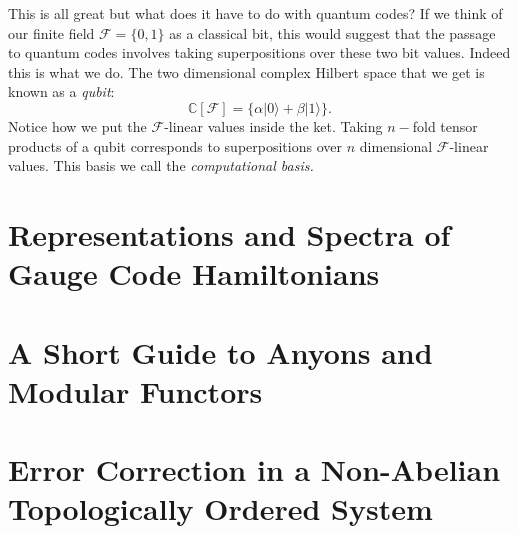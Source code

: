 \documentclass[11pt,twoside,openright]{report}
\newcommand{\todo}[1]{\textcolor{red}{#1}}
\def\Complex{\mathbb{C}}
\newcommand{\ket}[1]{|{#1}\rangle}
\newcommand{\Field}{\mathcal{F}}
\begin{document}
This is all great but what does it have to do with quantum codes?
If we think of our finite field $\Field=\{0,1\}$ as a classical
bit, this would suggest that the passage to quantum codes involves
taking superpositions over these two bit values.
Indeed this is what we do.
The two dimensional complex Hilbert space that we get
is known as a \emph{qubit}:
$$
    \Complex[\Field] = \{ \alpha \ket{0} + \beta \ket{1} \}.
$$
Notice how we put the $\Field$-linear values inside the ket.
Taking $n-$fold tensor products
of a qubit corresponds to superpositions over
$n$ dimensional $\Field$-linear values.
This basis we call the \emph{computational basis.}




%
%

%


\chapter{Representations and Spectra of Gauge Code Hamiltonians}




\chapter{A Short Guide to Anyons and Modular Functors}




\chapter{Error Correction in a Non-Abelian Topologically Ordered System}





{}

\end{document}

